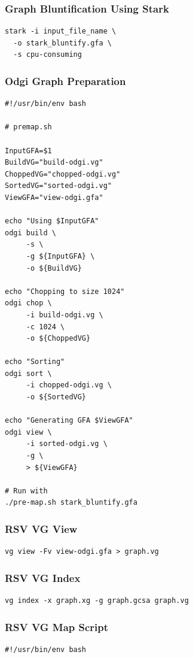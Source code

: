 \documentclass[10pt, a4paper]{article}
\begin{document}
\begin{appendices}
\subsubsection{Graph Bluntification Using Stark}
\label{sec:orge90aa0a}
\begin{verbatim}
stark -i input_file_name \
  -o stark_bluntify.gfa \
  -s cpu-consuming
\end{verbatim}

\subsubsection{Odgi Graph Preparation}
\label{sec:orgd0e0e18}
\begin{verbatim}
#!/usr/bin/env bash

# premap.sh

InputGFA=$1
BuildVG="build-odgi.vg"
ChoppedVG="chopped-odgi.vg"
SortedVG="sorted-odgi.vg"
ViewGFA="view-odgi.gfa"

echo "Using $InputGFA"
odgi build \
     -s \
     -g ${InputGFA} \
     -o ${BuildVG}

echo "Chopping to size 1024"
odgi chop \
     -i build-odgi.vg \
     -c 1024 \
     -o ${ChoppedVG}

echo "Sorting"
odgi sort \
     -i chopped-odgi.vg \
     -o ${SortedVG}

echo "Generating GFA $ViewGFA"
odgi view \
     -i sorted-odgi.vg \
     -g \
     > ${ViewGFA}

# Run with
./pre-map.sh stark_bluntify.gfa
\end{verbatim}

\subsubsection{RSV VG View}
\label{sec:org5b4d8a7}
\begin{verbatim}
vg view -Fv view-odgi.gfa > graph.vg
\end{verbatim}

\subsubsection{RSV VG Index}
\label{sec:org7b3e78b}
\begin{verbatim}
vg index -x graph.xg -g graph.gcsa graph.vg
\end{verbatim}

\subsubsection{RSV VG Map Script}
\label{sec:orge99b04d}
\begin{verbatim}
#!/usr/bin/env bash


\end{verbatim}
\end{appendices}
\end{document}
